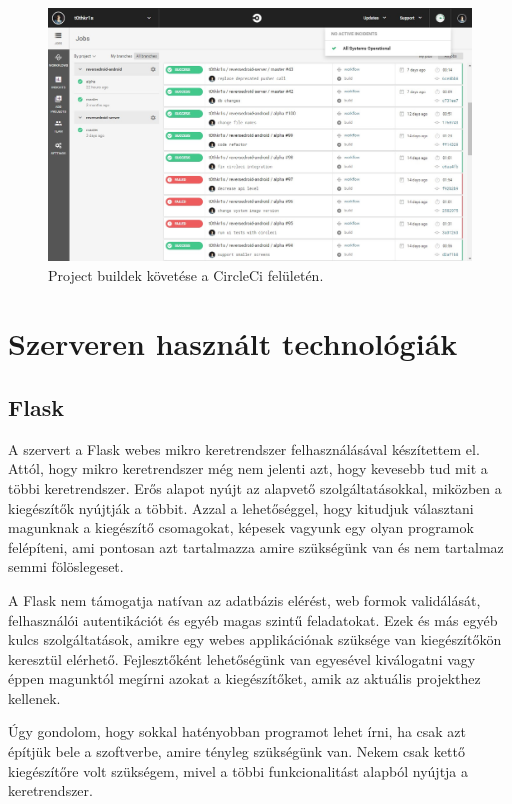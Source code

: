 \documentclass{thesis-ekf}
\theoremstyle{definition}
\theoremstyle{remark}
\begin{document}
\begin{figure}[!h]
	\centering
	\includegraphics[width=15cm]{pictures/circleci}
	\caption{Project buildek követése a CircleCi felületén.}
	\label{circleci}
\end{figure}

\newpage

\section{Szerveren használt technológiák}\label{szerveren_hasznalt_technologiak}

\subsection{Flask}

A szervert a Flask webes mikro keretrendszer felhasználásával készítettem el.
Attól, hogy mikro keretrendszer még nem jelenti azt, hogy kevesebb tud mit a többi keretrendszer.
Erős alapot nyújt az alapvető szolgáltatásokkal, miközben a kiegészítők nyújtják a többit.
Azzal a lehetőséggel, hogy kitudjuk választani magunknak a kiegészítő csomagokat, képesek vagyunk egy olyan programok felépíteni, ami pontosan azt tartalmazza amire szükségünk van és nem tartalmaz semmi fölöslegeset.

A Flask nem támogatja natívan az adatbázis elérést, web formok validálását, felhasználói autentikációt és egyéb magas szintű feladatokat.
Ezek és más egyéb kulcs szolgáltatások, amikre egy webes applikációnak szüksége van kiegészítőkön keresztül elérhető.
Fejlesztőként lehetőségünk van egyesével kiválogatni vagy éppen magunktól megírni azokat a kiegészítőket, amik az aktuális projekthez kellenek.
\cite{flask}

Úgy gondolom, hogy sokkal hatényobban programot lehet írni, ha csak azt építjük bele a szoftverbe, amire tényleg szükségünk van.
Nekem csak kettő kiegészítőre volt szükségem, mivel a többi funkcionalitást alapból nyújtja a keretrendszer.
\end{document}
